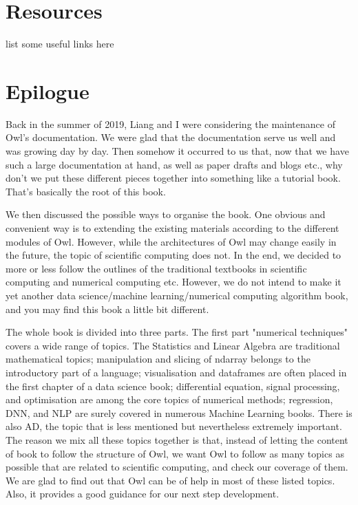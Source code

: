 \newpage



\hypertarget{Resources}{%
\section{Resources}\label{resources}}

list some useful links here

\newpage



\hypertarget{Epilogue}{%
\section{Epilogue}\label{epilogue}}

Back in the summer of 2019, Liang and I were considering the maintenance of Owl's documentation. We were glad that the documentation serve us well and was growing day by day.
Then somehow it occurred to us that, now that we have such a large documentation at hand, as well as paper drafts and blogs etc., why don't we put these different pieces together into something like a tutorial book.
That's basically the root of this book.

We then discussed the possible ways to organise the book.
One obvious and convenient way is to extending the existing materials according to the different modules of Owl.
However, while the architectures of Owl may change easily in the future, the topic of scientific computing does not.
In the end, we decided to more or less follow the outlines of the traditional textbooks in scientific computing and numerical computing etc.
However, we do not intend to make it yet another data science/machine learning/numerical computing algorithm book, and you may find this book a little bit different.

The whole book is divided into three parts.
The first part "numerical techniques" covers a wide range of topics.
The Statistics and Linear Algebra are traditional mathematical topics;
manipulation and slicing of ndarray belongs to the introductory part of a language;
visualisation and dataframes are often placed in the first chapter of a data science book;
differential equation, signal processing, and optimisation are among the core topics of numerical methods;
regression, DNN, and NLP are surely covered in numerous Machine Learning books.
There is also AD, the topic that is less mentioned but nevertheless extremely important.
The reason we mix all these topics together is that, instead of letting the content of book to follow the structure of Owl, we want Owl to follow as many topics as possible that are related to scientific computing, and check our coverage of them.
We are glad to find out that Owl can be of help in most of these listed topics.
Also, it provides a good guidance for our next step development.

